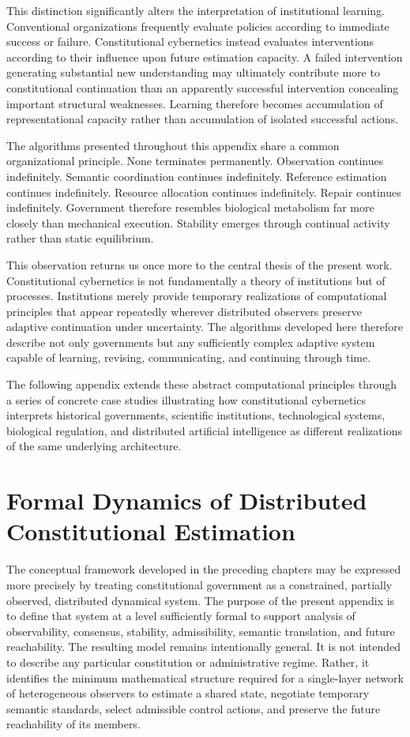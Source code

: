 \documentclass[12pt,a4paper]{article}
\begin{document}
This distinction significantly alters the interpretation of institutional learning. Conventional organizations frequently evaluate policies according to immediate success or failure. Constitutional cybernetics instead evaluates interventions according to their influence upon future estimation capacity. A failed intervention generating substantial new understanding may ultimately contribute more to constitutional continuation than an apparently successful intervention concealing important structural weaknesses. Learning therefore becomes accumulation of representational capacity rather than accumulation of isolated successful actions.

The algorithms presented throughout this appendix share a common organizational principle. None terminates permanently. Observation continues indefinitely. Semantic coordination continues indefinitely. Reference estimation continues indefinitely. Resource allocation continues indefinitely. Repair continues indefinitely. Government therefore resembles biological metabolism far more closely than mechanical execution. Stability emerges through continual activity rather than static equilibrium.

This observation returns us once more to the central thesis of the present work. Constitutional cybernetics is not fundamentally a theory of institutions but of processes. Institutions merely provide temporary realizations of computational principles that appear repeatedly wherever distributed observers preserve adaptive continuation under uncertainty. The algorithms developed here therefore describe not only governments but any sufficiently complex adaptive system capable of learning, revising, communicating, and continuing through time.

The following appendix extends these abstract computational principles through a series of concrete case studies illustrating how constitutional cybernetics interprets historical governments, scientific institutions, technological systems, biological regulation, and distributed artificial intelligence as different realizations of the same underlying architecture.

\section{Formal Dynamics of Distributed Constitutional Estimation}

The conceptual framework developed in the preceding chapters may be expressed more precisely by treating constitutional government as a constrained, partially observed, distributed dynamical system. The purpose of the present appendix is to define that system at a level sufficiently formal to support analysis of observability, consensus, stability, admissibility, semantic translation, and future reachability. The resulting model remains intentionally general. It is not intended to describe any particular constitution or administrative regime. Rather, it identifies the minimum mathematical structure required for a single-layer network of heterogeneous observers to estimate a shared state, negotiate temporary semantic standards, select admissible control actions, and preserve the future reachability of its members.
\end{document}
